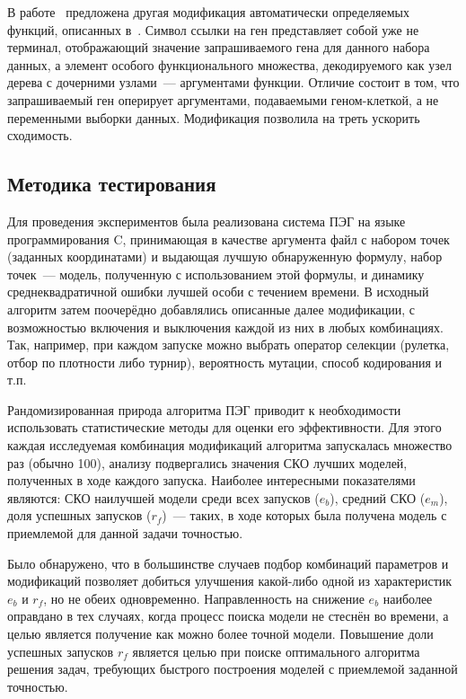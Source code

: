 В работе~\cite{Li:2008:GNF:1473248.1474006} предложена другая модификация автоматически определяемых функций, описанных в~\cite{Ferreira:2006:GSP}. Символ ссылки на ген представляет собой уже не терминал, отображающий значение запрашиваемого гена для данного набора данных, а элемент особого функционального множества, декодируемого как узел дерева с дочерними узлами~--- аргументами функции. Отличие состоит в том, что запрашиваемый ген оперирует аргументами, подаваемыми геном-клеткой, а не переменными выборки данных. Модификация позволила на треть ускорить сходимость.





\subsection{Методика тестирования}

Для проведения экспериментов была реализована система ПЭГ на языке программирования C, принимающая в качестве аргумента файл с набором точек (заданных координатами) и выдающая лучшую обнаруженную формулу, набор точек~--- модель, полученную с использованием этой формулы, и динамику среднеквадратичной ошибки лучшей особи с течением времени. В исходный алгоритм затем поочерёдно добавлялись описанные далее модификации, с возможностью включения и выключения каждой из них в любых комбинациях.  Так, например, при каждом запуске можно выбрать оператор селекции (рулетка, отбор по плотности либо турнир), вероятность мутации, способ кодирования и т.п.

Рандомизированная природа алгоритма ПЭГ приводит к необходимости использовать статистические методы для оценки его эффективности. Для этого каждая исследуемая комбинация модификаций алгоритма запускалась множество раз (обычно 100), анализу подвергались значения СКО лучших моделей, полученных в ходе каждого запуска. Наиболее интересными показателями являются: СКО наилучшей модели среди всех запусков ($e_{b}$), средний СКО ($e_{m}$), доля успешных запусков ($r_{f}$)~--- таких, в ходе которых была получена модель с приемлемой для данной задачи точностью.

Было обнаружено, что в большинстве случаев подбор комбинаций параметров и модификаций позволяет добиться улучшения какой-либо одной из характеристик $e_{b}$ и $r_{f}$, но не обеих одновременно. Направленность на снижение $e_{b}$ наиболее оправдано в тех случаях, когда процесс поиска модели не стеснён во времени, а целью является получение как можно более точной модели. Повышение доли успешных запусков $r_{f}$ является целью при поиске оптимального алгоритма решения задач, требующих быстрого построения моделей с приемлемой заданной точностью.

